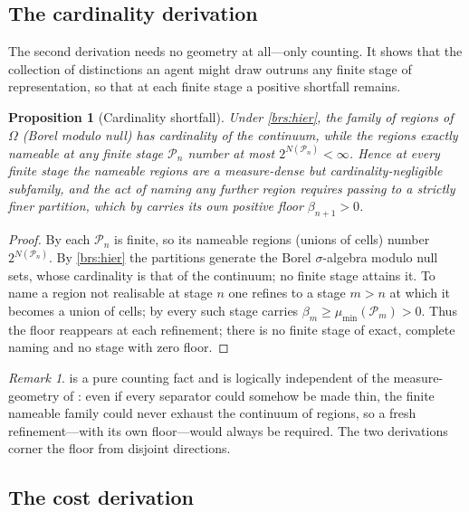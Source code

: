 \documentclass[11pt,a4paper]{article}
\theoremstyle{thmstyle}
\newtheorem{proposition}[theorem]{Proposition}
\theoremstyle{definition}
\theoremstyle{remark}
\newtheorem{remark}[theorem]{Remark}
\newcommand{\Space}{\Omega}
\newcommand{\thick}{\beta}
\newcommand{\Part}{\mathscr{P}}
\begin{document}
\subsection{The cardinality derivation}

The second derivation needs no geometry at all---only counting. It shows that the
collection of distinctions an agent might draw outruns any finite stage of
representation, so that at each finite stage a positive shortfall remains.

\begin{proposition}[Cardinality shortfall]
\label{prop:card}
Under \ref{brs:hier}, the family of regions of $\Space$ \textup{(}Borel modulo
null\textup{)} has cardinality of the continuum, while the regions exactly
nameable at any finite stage $\Part_n$ number at most $2^{N(\Part_n)}<\infty$.
Hence at every finite stage the nameable regions are a measure-dense but
cardinality-negligible subfamily, and the act of naming any further region
requires passing to a strictly finer partition, which by 
carries its own positive floor $\thick_{n+1}>0$.
\end{proposition}

\begin{proof}
By  each $\Part_n$ is finite, so its nameable regions
(unions of cells) number $2^{N(\Part_n)}$. By \ref{brs:hier} the partitions
generate the Borel $\sigma$-algebra modulo null sets, whose cardinality is that
of the continuum; no finite stage attains it. To name a region not realisable at
stage $n$ one refines to a stage $m>n$ at which it becomes a union of cells; by
 every such stage carries $\thick_m\ge\mu_{\min}(\Part_m)>0$.
Thus the floor reappears at each refinement; there is no finite stage of exact,
complete naming and no stage with zero floor.
\end{proof}

\begin{remark}
 is a pure counting fact and is logically independent of the
measure-geometry of : even if every separator could somehow
be made thin, the finite nameable family could never exhaust the continuum of
regions, so a fresh refinement---with its own floor---would always be required.
The two derivations corner the floor from disjoint directions.
\end{remark}

\subsection{The cost derivation}
\end{document}
